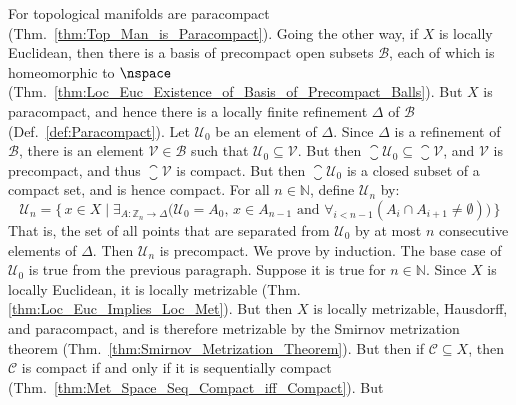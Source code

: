 \documentclass{article}                                                        %
\begin{document}
            \begin{solution}
                For topological manifolds are paracompact
                (Thm.~\ref{thm:Top_Man_is_Paracompact}). Going the other way, if $X$
                is locally Euclidean, then there is a basis of precompact open
                subsets $\mathcal{B}$, each of which is homeomorphic to $\nspace$
                (Thm.~\ref{thm:Loc_Euc_Existence_of_Basis_of_Precompact_Balls}). But
                $X$ is paracompact, and hence there is a locally finite refinement
                $\Delta$ of $\mathcal{B}$ (Def.~\ref{def:Paracompact}). Let
                $\mathcal{U}_{0}$ be an element of $\Delta$. Since $\Delta$ is a
                refinement of $\mathcal{B}$, there is an element
                $\mathcal{V}\in\mathcal{B}$ such that
                $\mathcal{U}_{0}\subseteq\mathcal{V}$. But then
                $\closure{\mathcal{U}_{0}}\subseteq\closure{\mathcal{V}}$, and
                $\mathcal{V}$ is precompact, and thus $\closure{\mathcal{V}}$
                is compact. But then $\closure{\mathcal{U}_{0}}$ is a closed subset
                of a compact set, and is hence compact. For all $n\in\mathbb{N}$,
                define $\mathcal{U}_{n}$ by:
                \begin{equation}
                    \mathcal{U}_{n}=\Big\{\,x\in{X}\;|\;
                        \exists_{A:\mathbb{Z}_{n}\rightarrow\Delta}\big(
                            \mathcal{U}_{0}=A_{0},\,x\in{A}_{n-1}\textrm{ and }
                            \forall_{i<n-1}(A_{i}\cap{A}_{i+1}\ne\emptyset)
                        \big)\,\Big\}
                \end{equation}
                That is, the set of all points that are separated from
                $\mathcal{U}_{0}$ by at most $n$ consecutive elements of $\Delta$.
                Then $\mathcal{U}_{n}$ is precompact. We prove by induction. The
                base case of $\mathcal{U}_{0}$ is true from the previous paragraph.
                Suppose it is true for $n\in\mathbb{N}$. Since $X$ is locally
                Euclidean, it is locally metrizable
                (Thm.\ref{thm:Loc_Euc_Implies_Loc_Met}). But then $X$ is locally
                metrizable, Hausdorff, and paracompact, and is therefore metrizable
                by the Smirnov metrization theorem
                (Thm.~\ref{thm:Smirnov_Metrization_Theorem}). But then if
                $\mathcal{C}\subseteq{X}$, then $\mathcal{C}$ is compact if and only
                if it is sequentially compact
                (Thm.~\ref{thm:Met_Space_Seq_Compact_iff_Compact}). But

\end{solution}
\end{document}
